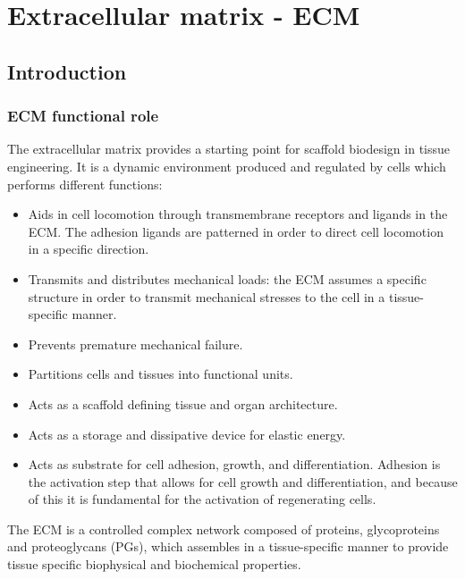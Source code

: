 \graphicspath{{chapters/03/images/}}
\chapter{Extracellular matrix - ECM}

\section{Introduction}

	\subsection{ECM functional role}
	The extracellular matrix provides a starting point for scaffold biodesign in tissue engineering.
	It is a dynamic environment produced and regulated by cells which performs different functions:

	\begin{multicols}{2}
		\begin{itemize}
			\item Aids in cell locomotion through transmembrane receptors and ligands in the ECM.
				The adhesion ligands are patterned in order to direct cell locomotion in a specific direction.
			\item Transmits and distributes mechanical loads: the ECM assumes a specific structure in order to transmit mechanical stresses to the cell in a tissue-specific manner.
			\item Prevents premature mechanical failure.
			\item Partitions cells and tissues into functional units.
			\item Acts as a scaffold defining tissue and organ architecture.
			\item Acts as a storage and dissipative device for elastic energy.
			\item Acts as substrate for cell adhesion, growth, and differentiation.
				Adhesion is the activation step that allows for cell growth and differentiation, and because of this it is fundamental for the activation of regenerating cells.
		\end{itemize}
	\end{multicols}

	The ECM is a controlled complex network composed of proteins, glycoproteins and proteoglycans (PGs), which assembles in a tissue-specific manner to provide tissue specific biophysical and biochemical properties.

